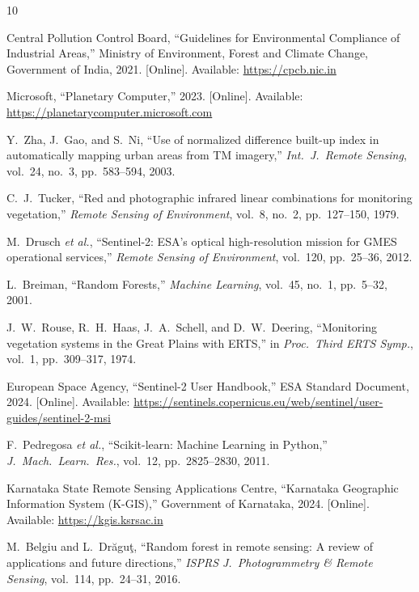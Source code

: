 \documentclass[conference,10pt]{IEEEtran}
\begin{document}
\balance
\begin{thebibliography}{10}

Central Pollution Control Board, ``Guidelines for Environmental Compliance of Industrial Areas,'' Ministry of Environment, Forest and Climate Change, Government of India, 2021. [Online]. Available: \url{https://cpcb.nic.in}

Microsoft, ``Planetary Computer,'' 2023. [Online]. Available: \url{https://planetarycomputer.microsoft.com}

Y.~Zha, J.~Gao, and S.~Ni, ``Use of normalized difference built-up index in automatically mapping urban areas from TM imagery,'' \textit{Int.\ J.\ Remote Sensing}, vol.~24, no.~3, pp.~583--594, 2003.

C.~J.~Tucker, ``Red and photographic infrared linear combinations for monitoring vegetation,'' \textit{Remote Sensing of Environment}, vol.~8, no.~2, pp.~127--150, 1979.

M.~Drusch \textit{et al.}, ``Sentinel-2: ESA's optical high-resolution mission for GMES operational services,'' \textit{Remote Sensing of Environment}, vol.~120, pp.~25--36, 2012.

L.~Breiman, ``Random Forests,'' \textit{Machine Learning}, vol.~45, no.~1, pp.~5--32, 2001.

J.~W.~Rouse, R.~H.~Haas, J.~A.~Schell, and D.~W.~Deering, ``Monitoring vegetation systems in the Great Plains with ERTS,'' in \textit{Proc.\ Third ERTS Symp.}, vol.~1, pp.~309--317, 1974.

European Space Agency, ``Sentinel-2 User Handbook,'' ESA Standard Document, 2024. [Online]. Available: \url{https://sentinels.copernicus.eu/web/sentinel/user-guides/sentinel-2-msi}

F.~Pedregosa \textit{et al.}, ``Scikit-learn: Machine Learning in Python,'' \textit{J.\ Mach.\ Learn.\ Res.}, vol.~12, pp.~2825--2830, 2011.

Karnataka State Remote Sensing Applications Centre, ``Karnataka Geographic Information System (K-GIS),'' Government of Karnataka, 2024. [Online]. Available: \url{https://kgis.ksrsac.in}

M.~Belgiu and L.~Dr\u{a}gu\c{t}, ``Random forest in remote sensing: A review of applications and future directions,'' \textit{ISPRS J.\ Photogrammetry \& Remote Sensing}, vol.~114, pp.~24--31, 2016.

\end{thebibliography}
\end{document}
